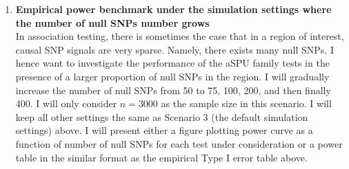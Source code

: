 \documentclass[12pt]{article}
\begin{document}
\begin{enumerate}
%

\item \textbf{Empirical power benchmark under the simulation settings where the number of null SNPs number grows}\\
In association testing, there is sometimes the case that in a region of interest, causal SNP signals are very sparse. Namely, there exists many null SNPs. I hence want to investigate the performance of the aSPU family tests in the presence of a larger proportion of null SNPs in the region. I will gradually increase the number of null SNPs from 50 to 75, 100, 200, and then finally 400. I will only consider $n = 3000$ as the sample size in this scenario. I will keep all other settings the same as Scenario 3 (the default simulation settings) above. I will present either a figure plotting power curve as a function of number of null SNPs for each test under consideration or a power table in the similar format as the empirical Type I error table above.


\end{enumerate}
\end{document}
